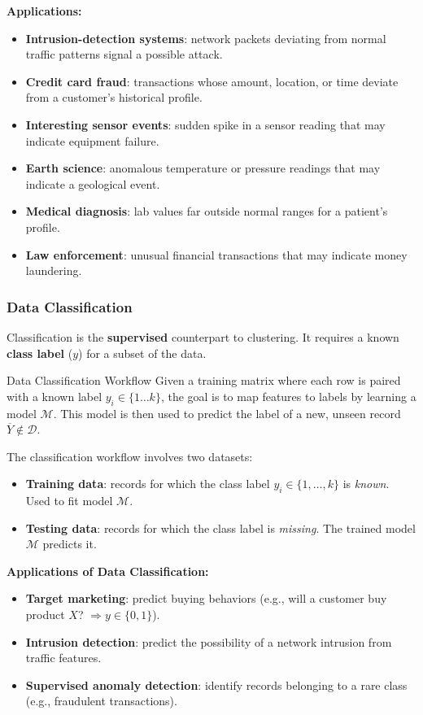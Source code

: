 \documentclass[11pt]{article}
\theoremstyle{smallexample}
\newcommand{\vs}{\vspace{0.2\baselineskip}}
\begin{document}
\vs
\textbf{Applications:}
\begin{itemize}
    \item \textbf{Intrusion-detection systems}: network packets deviating from
    normal traffic patterns signal a possible attack.
    \item \textbf{Credit card fraud}: transactions whose amount, location, or
    time deviate from a customer's historical profile.
    \item \textbf{Interesting sensor events}: sudden spike in a sensor reading
    that may indicate equipment failure.
    \item \textbf{Earth science}: anomalous temperature or pressure readings that
    may indicate a geological event.
    \item \textbf{Medical diagnosis}: lab values far outside normal ranges for a
    patient's profile.
    \item \textbf{Law enforcement}: unusual financial transactions that may
    indicate money laundering.
\end{itemize}

\subsubsection{Data Classification}

Classification is the \textbf{supervised} counterpart to clustering. It requires a known \textbf{class label} ($y$) for a subset of the data. 

\begin{defbox}{Data Classification Workflow}
    Given a training matrix where each row is paired with a known label $y_i \in \{1 \ldots k\}$, the goal is to map features to labels by learning a model $\mathcal{M}$. This model is then used to predict the label of a new, unseen record $\overline{Y} \notin \mathcal{D}$.
\end{defbox}


The classification workflow involves two datasets:
\begin{itemize}
    \item \textbf{Training data}: records for which the class label $y_i \in
    \{1, \ldots, k\}$ is \textit{known}. Used to fit model $\mathcal{M}$.
    \item \textbf{Testing data}: records for which the class label is
    \textit{missing}. The trained model $\mathcal{M}$ predicts it.
\end{itemize}

\vs
\textbf{Applications of Data Classification:}
\begin{itemize}
    \item \textbf{Target marketing}: predict buying behaviors
    (e.g., will a customer buy product $X$? $\Rightarrow y \in \{0,1\}$).
    \item \textbf{Intrusion detection}: predict the possibility of a network
    intrusion from traffic features.
    \item \textbf{Supervised anomaly detection}: identify records belonging to
    a rare class (e.g., fraudulent transactions).
\end{itemize}
\end{document}
